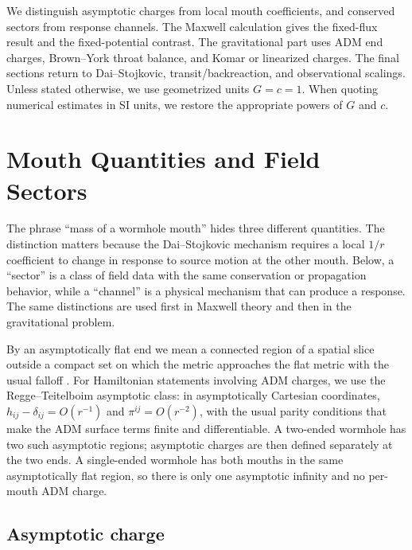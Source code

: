\documentclass[aps,prd,10pt,onecolumn,nofootinbib,superscriptaddress,floatfix]{revtex4-2}
\begin{document}
We distinguish asymptotic charges from local mouth coefficients, and conserved
sectors from response channels.  The Maxwell calculation gives the fixed-flux
result and the fixed-potential contrast.  The gravitational part uses ADM end
charges, Brown--York throat balance, and Komar or linearized
charges.  The final sections return to Dai--Stojkovic, transit/backreaction,
and observational scalings.
Unless stated otherwise, we use geometrized units $G=c=1$.  When quoting
numerical estimates in SI units, we restore the appropriate powers of $G$ and
$c$.

\section{Mouth Quantities and Field Sectors}
\label{sec:quantities}

The phrase ``mass of a wormhole mouth'' hides three different quantities.  The
distinction matters because the Dai--Stojkovic mechanism requires a local
$1/r$ coefficient to change in response to source motion at the other mouth.
Below, a ``sector'' is a class of field data with the same conservation or
propagation behavior, while a ``channel'' is a physical mechanism that can
produce a response.  The same distinctions are used first in Maxwell theory and
then in the gravitational problem.

By an asymptotically flat end we mean a connected region of a spatial slice
outside a compact set on which the metric approaches the flat metric with the
usual falloff
\cite{ArnowittDeserMisner1962Dynamics,ReggeTeitelboim1974SurfaceIntegrals,
Bartnik1986Mass}.  For Hamiltonian statements involving ADM charges, we use
the Regge--Teitelboim asymptotic class: in asymptotically Cartesian
coordinates, $h_{ij}-\delta_{ij}=O(r^{-1})$ and $\pi^{ij}=O(r^{-2})$, with the
usual parity conditions that make the ADM surface terms finite and
differentiable.  A two-ended wormhole has two such asymptotic regions;
asymptotic charges are then defined separately at the two ends.  A
single-ended wormhole has both mouths in the same asymptotically flat region,
so there is only one asymptotic infinity and no per-mouth ADM charge.

\subsection{Asymptotic charge}
\end{document}
